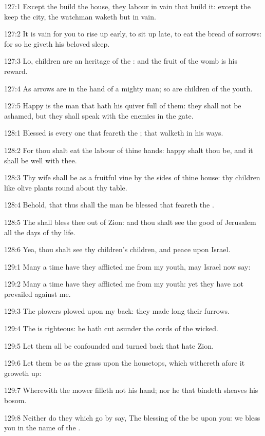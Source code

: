 127:1 Except the \LORD build the house, they labour in vain that build
it: except the \LORD keep the city, the watchman waketh but in vain.

127:2 It is vain for you to rise up early, to sit up late, to eat the
bread of sorrows: for so he giveth his beloved sleep.

127:3 Lo, children are an heritage of the \LORD: and the fruit of the
womb is his reward.

127:4 As arrows are in the hand of a mighty man; so are children of
the youth.

127:5 Happy is the man that hath his quiver full of them: they shall
not be ashamed, but they shall speak with the enemies in the gate.



128:1 Blessed is every one that feareth the \LORD; that walketh in his
ways.

128:2 For thou shalt eat the labour of thine hands: happy shalt thou
be, and it shall be well with thee.

128:3 Thy wife shall be as a fruitful vine by the sides of thine
house: thy children like olive plants round about thy table.

128:4 Behold, that thus shall the man be blessed that feareth the
\LORD.

128:5 The \LORD shall bless thee out of Zion: and thou shalt see the
good of Jerusalem all the days of thy life.

128:6 Yea, thou shalt see thy children's children, and peace upon
Israel.



129:1 Many a time have they afflicted me from my youth, may Israel now
say:

129:2 Many a time have they afflicted me from my youth: yet they have
not prevailed against me.

129:3 The plowers plowed upon my back: they made long their furrows.

129:4 The \LORD is righteous: he hath cut asunder the cords of the
wicked.

129:5 Let them all be confounded and turned back that hate Zion.

129:6 Let them be as the grass upon the housetops, which withereth
afore it groweth up:

129:7 Wherewith the mower filleth not his hand; nor he that bindeth
sheaves his bosom.

129:8 Neither do they which go by say, The blessing of the \LORD be
upon you: we bless you in the name of the \LORD.



